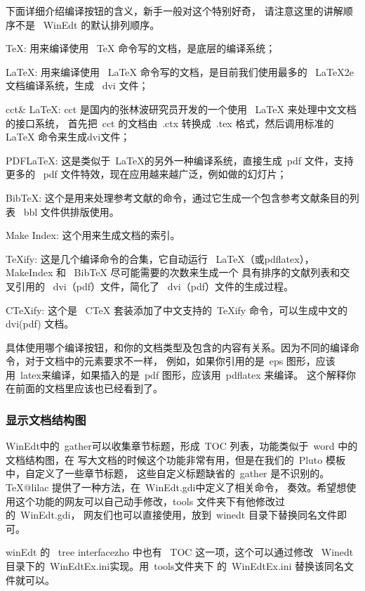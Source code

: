 下面详细介绍编译按钮的含义，新手一般对这个特别好奇，
请注意这里的讲解顺序不是~ WinEdt 的默认排列顺序。
\begin{hitlist}
  \item TeX: 用来编译使用~ TeX 命令写的文档，是底层的编译系统；
  \item LaTeX: 用来编译使用~ LaTeX 命令写的文档，是目前我们使用最多的~ LaTeX2e 文档编译系统，生成~ dvi 文件；
  \item cct\& LaTeX: cct 是国内的张林波研究员开发的一个使用~ LaTeX 来处理中文文档的接口系统，
  首先把~cct 的文档由~.ctx 转换成~.tex 格式，然后调用标准的~ LaTeX 命令来生成dvi文件；
  \item PDFLaTeX: 这是类似于~LaTeX的另外一种编译系统，直接生成~pdf 文件，支持更多的~ pdf 文件特效，现在应用越来越广泛，例如做的幻灯片；
  \item BibTeX: 这个是用来处理参考文献的命令，通过它生成一个包含参考文献条目的列表~ bbl 文件供排版使用。
  \item Make Index: 这个用来生成文档的索引。
  \item TeXify: 这是几个编译命令的合集，它自动运行~ LaTeX（或pdflatex），MakeIndex 和~ BibTeX 尽可能需要的次数来生成一个
  具有排序的文献列表和交叉引用的~ dvi（pdf）文件，简化了~ dvi（pdf）文件的生成过程。
  \item CTeXify: 这个是~ CTeX 套装添加了中文支持的~TeXify 命令，可以生成中文的~ dvi(pdf) 文档。
\end{hitlist}

具体使用哪个编译按钮，和你的文档类型及包含的内容有关系。因为不同的编译命令，对于文档中的元素要求不一样，
例如，如果你引用的是~eps 图形，应该用~latex来编译，如果插入的是~pdf 图形，应该用~pdflatex 来编译。
这个解释你在前面的文档里应该也已经看到了。

\subsubsection{显示文档结构图}

WinEdt中的~gather可以收集章节标题，形成~TOC 列表，功能类似于~word 中的文档结构图，在
写大文档的时候这个功能非常有用，但是在我们的~Pluto 模板中，自定义了一些章节标题，
这些自定义标题缺省的~gather 是不识别的。TeX@lilac 提供了一种方法，在~WinEdt.gdi中定义了相关命令，
奏效。希望想使用这个功能的网友可以自己动手修改，tools 文件夹下有他修改过的~WinEdt.gdi，
网友们也可以直接使用，放到~winedt 目录下替换同名文件即可。

winEdt 的~ tree interfacezho 中也有~ TOC 这一项，这个可以通过修改 ~Winedt目录下的~WinEdtEx.ini实现。用~tools文件夹下
的~WinEdtEx.ini 替换该同名文件就可以。

